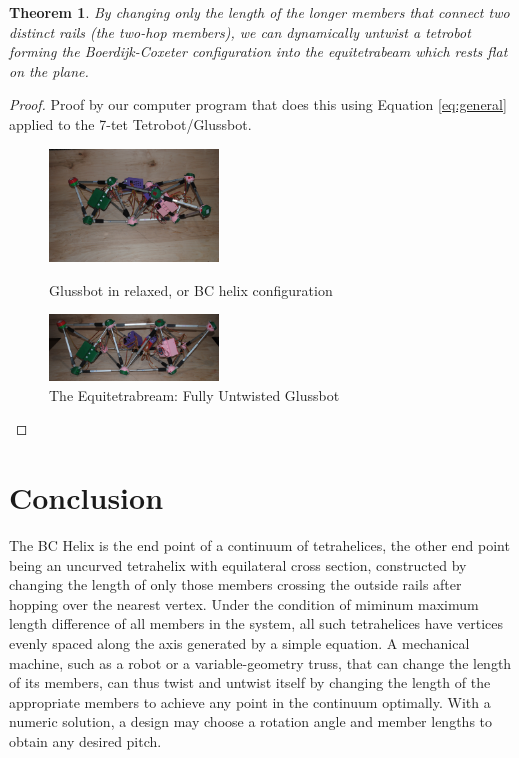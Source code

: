 \documentclass[11pt]{article}
\newtheorem{theorem}{Theorem}
\begin{document}
\begin{theorem}
  By changing only the length of the longer members that connect two distinct rails (the two-hop members), we can dynamically untwist a tetrobot
  forming the Boerdijk-Coxeter configuration into the equitetrabeam which rests flat on the plane.
\end{theorem}

\begin{proof}
  Proof by our computer program that does this using Equation \eqref{eq:general} applied to the
  7-tet Tetrobot/Glussbot.

\begin{figure}[H] %
  \centering
     \includegraphics[width=0.4\textwidth]{figures/GlussBotBC.jpg}
     \caption{Glussbot in relaxed, or BC helix configuration}
     \includegraphics[width=0.4\textwidth]{figures/GlussBotEquitetrabeamCropped.jpg}
     \caption{The Equitetrabream: Fully Untwisted Glussbot}
\end{figure}

\end{proof}

\section{Conclusion}

The BC Helix is the end point of a continuum of tetrahelices, the
other end point being an uncurved tetrahelix with equilateral cross
section, constructed by changing the length of only those members
crossing the outside rails after hopping over the nearest
vertex. Under the condition of miminum maximum length difference of
all members in the system, all such tetrahelices have vertices evenly
spaced along the axis generated by a simple equation.  A mechanical
machine, such as a robot or a variable-geometry truss, that can change
the length of its members, can thus twist and untwist itself by
changing the length of the appropriate members to achieve any point in
the continuum optimally. With a numeric solution, a design may choose
a rotation angle and member lengths to obtain any desired pitch.
\end{document}
